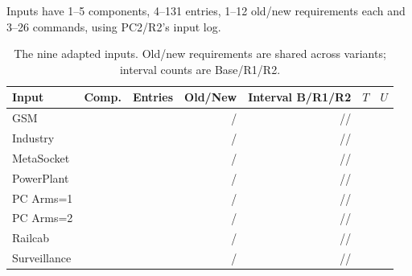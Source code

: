 Inputs have 1--5 components, 4--131 entries, 1--12 old/new requirements each and 3--26 commands, using PC2/R2's input log.
\begin{table}[!htbp]
\caption{The nine adapted inputs. Old/new requirements are shared across variants; interval counts are Base/R1/R2.}
\label{tab:input-structure}
\centering\small
\begin{tabular}{@{}lrrrrrr@{}}\toprule
Input & Comp. & Entries & Old/New & Interval B/R1/R2 & $T$ & $U$\\\midrule
GSM & \ContractGSMComponents{} & \FixedGSMEntries{} & \ContractGSMOld{}/\ContractGSMNew{} & \ContractGSMBase{}/\ContractGSMROne{}/\ContractGSMRTwo{} & \ContractGSMTransferPairs{} & \ContractGSMUpdates{}\\
Industry & \ContractIndustryComponents{} & \FixedIndustryEntries{} & \ContractIndustryOld{}/\ContractIndustryNew{} & \ContractIndustryBase{}/\ContractIndustryROne{}/\ContractIndustryRTwo{} & \ContractIndustryTransferPairs{} & \ContractIndustryUpdates{}\\
MetaSocket & \ContractMetaSocketComponents{} & \FixedMetaSocketEntries{} & \ContractMetaSocketOld{}/\ContractMetaSocketNew{} & \ContractMetaSocketBase{}/\ContractMetaSocketROne{}/\ContractMetaSocketRTwo{} & \ContractMetaSocketTransferPairs{} & \ContractMetaSocketUpdates{}\\
PowerPlant & \ContractPowerPlantComponents{} & \FixedPowerPlantEntries{} & \ContractPowerPlantOld{}/\ContractPowerPlantNew{} & \ContractPowerPlantBase{}/\ContractPowerPlantROne{}/\ContractPowerPlantRTwo{} & \ContractPowerPlantTransferPairs{} & \ContractPowerPlantUpdates{}\\
PC Arms=1 & \ContractPCOneComponents{} & \FixedPCOneEntries{} & \ContractPCOneOld{}/\ContractPCOneNew{} & \ContractPCOneBase{}/\ContractPCOneROne{}/\ContractPCOneRTwo{} & \ContractPCOneTransferPairs{} & \ContractPCOneUpdates{}\\
PC Arms=2 & \ContractPCTwoComponents{} & \FixedPCTwoEntries{} & \ContractPCTwoOld{}/\ContractPCTwoNew{} & \ContractPCTwoBase{}/\ContractPCTwoROne{}/\ContractPCTwoRTwo{} & \ContractPCTwoTransferPairs{} & \ContractPCTwoUpdates{}\\
Railcab & \ContractRailcabComponents{} & \FixedRailcabEntries{} & \ContractRailcabOld{}/\ContractRailcabNew{} & \ContractRailcabBase{}/\ContractRailcabROne{}/\ContractRailcabRTwo{} & \ContractRailcabTransferPairs{} & \ContractRailcabUpdates{}\\
Surveillance & \ContractSurveillanceComponents{} & \FixedSurveillanceEntries{} & \ContractSurveillanceOld{}/\ContractSurveillanceNew{} & \ContractSurveillanceBase{}/\ContractSurveillanceROne{}/\ContractSurveillanceRTwo{} & \ContractSurveillanceTransferPairs{} & \ContractSurveillanceUpdates{}\\

\end{tabular}
\end{table}

